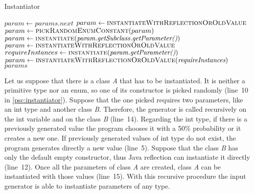 \begin{algorithm}
	\caption{Instantiator}\label{psc:instantiator}
	\begin{algorithmic}[1]
			\State $param \gets \textit{params.next}$
				\State $param \gets \Call{instantiateWithReflectionOrOldValue}{}$
				\State $param \gets \Call{pickRandomEnumConstant}{param}$
				\State $param \gets \Call{instantiate}{\textit{param.getSubclass.getParameter()}}$
			\Else 
					\State $param \gets \Call{instantiateWithReflectionOrOldValue}{}$
				\Else 
					\State $requireInstances \gets \Call{instantiate}{\textit{param.getParameter()}}$
					\State $param \gets \Call{instantiateWithReflectionOrOldValue}{\textit{requireInstances}}$
				\EndIf
			\EndIf	
		\EndFor
		\Return $params$ 
		\EndProcedure
	\end{algorithmic}
\end{algorithm}

Let us suppose that there is a class \textit{A} that has to be instantiated. It is neither a  primitive type nor an enum, so one of its constructor is picked randomly (line~10 in \autoref{psc:instantiator}). Suppose that the one picked requires two parameters, like an int type and another class \textit{B}. Therefore, the generator is called recursively on the int variable and on the class \textit{B} (line~14).
Regarding the int type, if there is a previously generated value the program chooses it with a 50\% probability or it creates a new one. If previously generated values of int type do not exist, the program generates directly a new value (line~5).
Suppose that the class \textit{B} has only the default empty constructor, thus Java reflection can instantiate it directly (line~12). Once all the parameters of class \textit{A} are created, class \textit{A} can be instantiated with those values (line~15). With this recursive procedure the input generator is able to instantiate parameters of any type.


